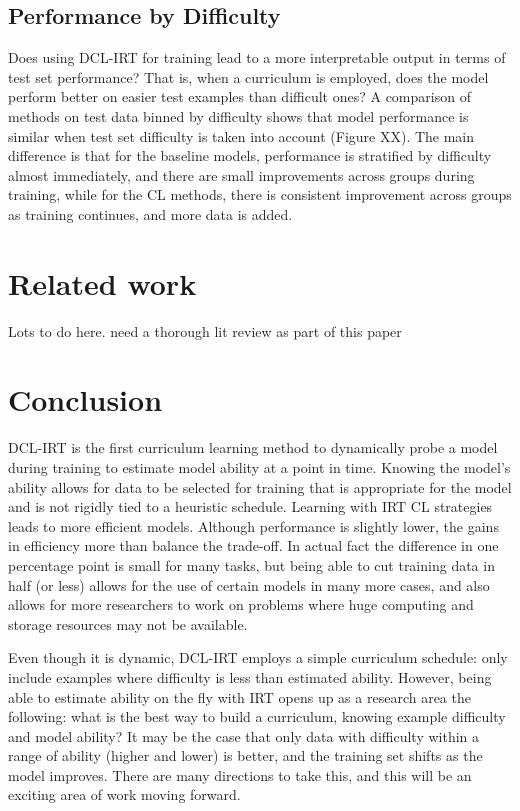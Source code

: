 \documentclass[letterpaper]{article} %
\begin{document}
\subsection{Performance by Difficulty}
Does using DCL-IRT for training lead to a more interpretable output in terms of test set performance?
That is, when a curriculum is employed, does the model perform better on easier test examples than difficult ones?
A comparison of methods on test data binned by difficulty shows that model performance is similar when test set difficulty is taken into account (Figure XX).
The main difference is that for the baseline models, performance is stratified by difficulty almost immediately, and there are small improvements across groups during training, while for the CL methods, there is consistent improvement across groups as training continues, and more data is added. 


\section{Related work}

Lots to do here. need a thorough lit review as part of this paper 

\section{Conclusion} 

DCL-IRT is the first curriculum learning method to dynamically probe a model during training to estimate model ability at a point in time.
Knowing the model's ability allows for data to be selected for training that is appropriate for the model and is not rigidly tied to a heuristic schedule.
Learning with IRT CL strategies leads to more efficient models.
Although performance is slightly lower, the gains in efficiency more than balance the trade-off.
In actual fact the difference in one percentage point is small for many tasks, but being able to cut training data in half (or less) allows for the use of certain models in many more cases, and also allows for more researchers to work on problems where huge computing and storage resources may not be available.

Even though it is dynamic, DCL-IRT employs a simple curriculum schedule: only include examples where difficulty is less than estimated ability.
However, being able to estimate ability on the fly with IRT opens up as a research area the following: what is the best way to build a curriculum, knowing example difficulty and model ability?
It may be the case that only data with difficulty within a range of ability (higher and lower) is better, and the training set shifts as the model improves.
There are many directions to take this, and this will be an exciting area of work moving forward.
\end{document}
